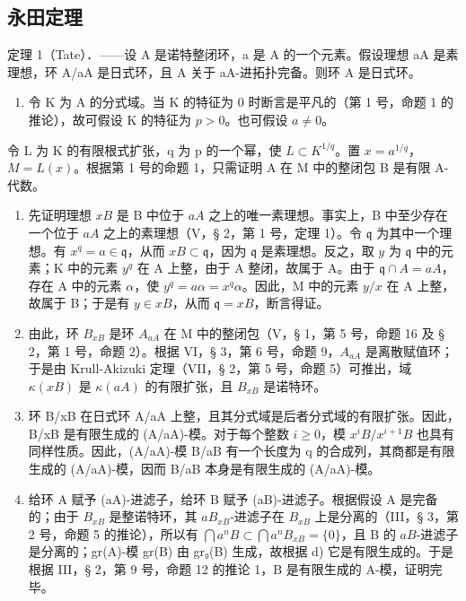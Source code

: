 \subsection{永田定理}

定理 1（Tate）．——设 A 是诺特整闭环，a 是 A 的一个元素。假设理想 aA 是素理想，环 A/aA 是日式环，且 A 关于 aA-进拓扑完备。则环 A 是日式环。

\begin{enumerate}
\def\labelenumi{\alph{enumi})}
\tightlist
\item
  令 K 为 A 的分式域。当 K 的特征为 0 时断言是平凡的（第 1 号，命题 1 的推论），故可假设 K 的特征为 \(p > 0\)。也可假设 \(a \neq 0\)。
\end{enumerate}

令 L 为 K 的有限根式扩张，q 为 p 的一个幂，使 \(L \subset K^{1/q}\)。置 \(x = a^{1/q}\)，\(M = L(x)\)。根据第 1 号的命题 1，只需证明 A 在 M 中的整闭包 B 是有限 A-代数。

\begin{enumerate}
\def\labelenumi{\alph{enumi})}
\setcounter{enumi}{1}
\item
  先证明理想 \(xB\) 是 B 中位于 \(aA\) 之上的唯一素理想。事实上，B 中至少存在一个位于 \(aA\) 之上的素理想（V，§ 2，第 1 号，定理 1）。令 \(\mathfrak{q}\) 为其中一个理想。有 \(x^{q} = a \in \mathfrak{q}\)，从而 \(xB \subset \mathfrak{q}\)，因为 \(\mathfrak{q}\) 是素理想。反之，取 \(y\) 为 \(\mathfrak{q}\) 中的元素；K 中的元素 \(y^{q}\) 在 A 上整，由于 A 整闭，故属于 A。由于 \(\mathfrak{q} \cap A = aA\)，存在 A 中的元素 \(\alpha\)，使 \(y^{q} = a\alpha = x^{q}\alpha\)。因此，M 中的元素 \(y/x\) 在 A 上整，故属于 B；于是有 \(y \in xB\)，从而 \(\mathfrak{q} = xB\)，断言得证。
\item
  由此，环 \(B_{xB}\) 是环 \(A_{aA}\) 在 M 中的整闭包（V，§ 1，第 5 号，命题 16 及 § 2，第 1 号，命题 2）。根据 VI，§ 3，第 6 号，命题 9，\(A_{aA}\) 是离散赋值环；于是由 Krull-Akizuki 定理（VII，§ 2，第 5 号，命题 5）可推出，域 \(\kappa(xB)\) 是 \(\kappa(aA)\) 的有限扩张，且 \(B_{xB}\) 是诺特环。
\item
  环 B/xB 在日式环 A/aA 上整，且其分式域是后者分式域的有限扩张。因此，B/xB 是有限生成的 (A/aA)-模。对于每个整数 \(i \geqslant 0\)，模 \(x^{i}B/x^{i+1}B\) 也具有同样性质。因此，(A/aA)-模 B/aB 有一个长度为 q 的合成列，其商都是有限生成的 (A/aA)-模，因而 B/aB 本身是有限生成的 (A/aA)-模。
\item
  给环 A 赋予 (aA)-进滤子，给环 B 赋予 (aB)-进滤子。根据假设 A 是完备的；由于 \(B_{xB}\) 是整诺特环，其 \(aB_{xB}\)-进滤子在 \(B_{xB}\) 上是分离的（III，§ 3，第 2 号，命题 5 的推论），所以有 \(\bigcap a^{n}B \subset \bigcap a^{n}B_{xB} = \{0\}\)，且 B 的 \(aB\)-进滤子是分离的；gr(A)-模 gr(B) 由 gr₀(B) 生成，故根据 d) 它是有限生成的。于是根据 III，§ 2，第 9 号，命题 12 的推论 1，B 是有限生成的 A-模，证明完毕。
\end{enumerate}

